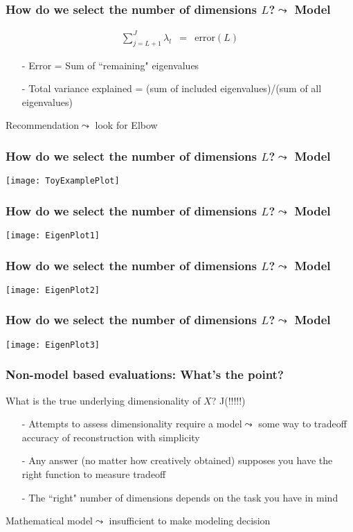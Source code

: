 \begin{frame}[fragile]
\frametitle{How do we select the number of dimensions $L$?$\leadsto$ \alert{Model}}

\begin{eqnarray}
\sum_{j=L+1}^{J} \lambda_{l}  & = & \text{error}(L) \nonumber   
\end{eqnarray}

\begin{itemize}
\item[-] Error = Sum of ``remaining" eigenvalues
\item[-] Total variance explained =  (sum of included eigenvalues)/(sum of all eigenvalues) 
\end{itemize}
Recommendation$\leadsto$ look for Elbow 
\end{frame}

\begin{frame}[fragile]
\frametitle{How do we select the number of dimensions $L$?$\leadsto$ \alert{Model}}
\texttt{[image: ToyExamplePlot]}
\end{frame}


\begin{frame}[fragile]
\frametitle{How do we select the number of dimensions $L$?$\leadsto$ \alert{Model}}
\texttt{[image: EigenPlot1]}
\end{frame}


\begin{frame}[fragile]
\frametitle{How do we select the number of dimensions $L$?$\leadsto$ \alert{Model}}
\texttt{[image: EigenPlot2]}
\end{frame}



\begin{frame}[fragile]
\frametitle{How do we select the number of dimensions $L$?$\leadsto$ \alert{Model}}
\texttt{[image: EigenPlot3]}
\end{frame}

\begin{frame}[fragile]
\frametitle{Non-model based evaluations: What's the point?}

What is the true underlying dimensionality of ${X}$? \alert{J}(!!!!!)  \\

\begin{itemize}
\item[-] Attempts to assess dimensionality require a \alert{model}$\leadsto$ some way to tradeoff accuracy of reconstruction with simplicity
\item[-] \alert{Any} answer (no matter how creatively obtained) supposes \alert{you have the right function to measure tradeoff}
\item[-] The ``right" number of dimensions depends on the \alert{task} you have in mind
\end{itemize}


{\large Mathematical model$\leadsto$ insufficient to make modeling decision} 

\end{frame}



